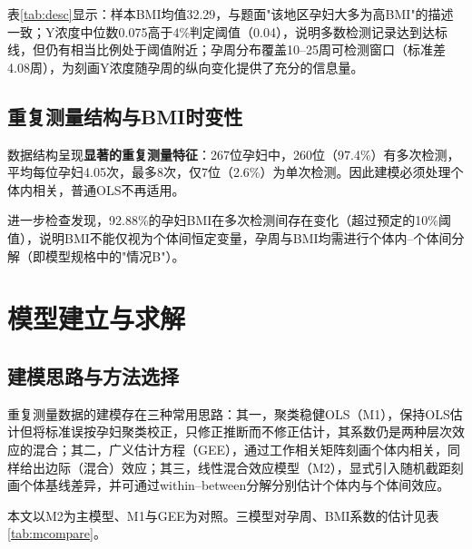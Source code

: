 \documentclass[12pt,a4paper]{ctexart}
\begin{document}
表\ref{tab:desc}显示：样本BMI均值32.29，与题面"该地区孕妇大多为高BMI"的描述一致；Y浓度中位数0.075高于4\%判定阈值（0.04），说明多数检测记录达到达标线，但仍有相当比例处于阈值附近；孕周分布覆盖10--25周可检测窗口（标准差4.08周），为刻画Y浓度随孕周的纵向变化提供了充分的信息量。

\subsection{重复测量结构与BMI时变性}

数据结构呈现\textbf{显著的重复测量特征}：267位孕妇中，260位（97.4\%）有多次检测，平均每位孕妇4.05次，最多8次，仅7位（2.6\%）为单次检测。因此建模必须处理个体内相关，普通OLS不再适用。

进一步检查发现，92.88\%的孕妇BMI在多次检测间存在变化（超过预定的10\%阈值），说明BMI不能仅视为个体间恒定变量，孕周与BMI均需进行个体内--个体间分解（即模型规格中的"情况B"）。

\section{模型建立与求解}

\subsection{建模思路与方法选择}

重复测量数据的建模存在三种常用思路：其一，聚类稳健OLS（M1），保持OLS估计但将标准误按孕妇聚类校正，只修正推断而不修正估计，其系数仍是两种层次效应的混合\cite{cameron,wooldridge}；其二，广义估计方程（GEE），通过工作相关矩阵刻画个体内相关，同样给出边际（混合）效应\cite{liang}；其三，线性混合效应模型（M2），显式引入随机截距刻画个体基线差异，并可通过within--between分解分别估计个体内与个体间效应\cite{laird,pinheiro}。

本文以M2为主模型、M1与GEE为对照。三模型对孕周、BMI系数的估计见表\ref{tab:mcompare}。
\end{document}
